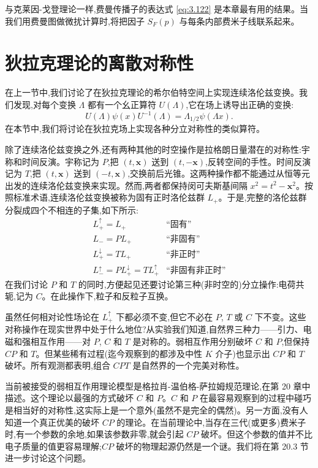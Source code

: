 与克莱因-戈登理论一样,费曼传播子的表达式 \eqref{eq:3.122} 是本章最有用的结果。当我们用费曼图做微扰计算时,将把因子 $S_F(p)$ 与每条内部费米子线联系起来。

\section{狄拉克理论的离散对称性}

在上一节中,我们讨论了在狄拉克理论的希尔伯特空间上实现连续洛伦兹变换。我们发现,对每个变换 $\Lambda$ 都有一个幺正算符 $U(\Lambda)$,它在场上诱导出正确的变换:
\begin{equation}
  U(\Lambda)\psi(x)U^{-1}(\Lambda) = \Lambda_{1/2}\psi(\Lambda x).
  \label{eq:3.123}
\end{equation}
在本节中,我们将讨论在狄拉克场上实现各种分立对称性的类似算符。

除了连续洛伦兹变换之外,还有两种其他的时空操作是拉格朗日量潜在的对称性:宇称和时间反演。宇称记为 $P$,把 $(t,\mathbf{x})$ 送到 $(t,-\mathbf{x})$,反转空间的手性。时间反演记为 $T$,把 $(t,\mathbf{x})$ 送到 $(-t,\mathbf{x})$,交换前后光锥。这两种操作都不能通过从恒等元出发的连续洛伦兹变换来实现。然而,两者都保持闵可夫斯基间隔 $x^2 = t^2 - \mathbf{x}^2$。按照标准术语,连续洛伦兹变换被称为固有正时洛伦兹群 $L_+$。于是,完整的洛伦兹群分裂成四个不相连的子集,如下所示:
\begin{equation}
  \begin{array}{ll}
    L_+^\uparrow = L_+ & \text{``固有''}\\
    L_- = PL_+ & \text{``非固有''}\\
    L_+^\downarrow = TL_+ & \text{``非正时''}\\
    L_-^\uparrow = PL_+^\downarrow = TL_+^\uparrow &
      \text{``非固有非正时''}
  \end{array}
\end{equation}
在我们讨论 $P$ 和 $T$ 的同时,方便起见还要讨论第三种(非时空的)分立操作:电荷共轭,记为 $C$。在此操作下,粒子和反粒子互换。

虽然任何相对论性场论在 $L_+^\uparrow$ 下都必须不变,但它不必在 $P$, $T$ 或 $C$ 下不变。这些对称操作在现实世界中处于什么地位?从实验我们知道,自然界三种力——引力、电磁和强相互作用——对 $P$, $C$ 和 $T$ 是对称的。弱相互作用分别破坏 $C$ 和 $P$,但保持 $CP$ 和 $T$。但某些稀有过程(迄今观察到的都涉及中性 $K$ 介子)也显示出 $CP$ 和 $T$ 破坏。所有观测都表明,组合 $CPT$ 是自然界的一个完美对称性。

当前被接受的弱相互作用理论模型是格拉肖-温伯格-萨拉姆规范理论,在第 20 章中描述。这个理论以最强的方式破坏 $C$ 和 $P$。$C$ 和 $P$ 在最容易观察到的过程中碰巧是相当好的对称性,这实际上是一个意外(虽然不是完全的偶然)。另一方面,没有人知道一个真正优美的破坏 $CP$ 的理论。在当前理论中,当存在三代(或更多)费米子时,有一个参数的余地,如果该参数非零,就会引起 $CP$ 破坏。但这个参数的值并不比电子质量的值更容易理解;$CP$ 破坏的物理起源仍然是一个谜。我们将在第 20.3 节进一步讨论这个问题。

